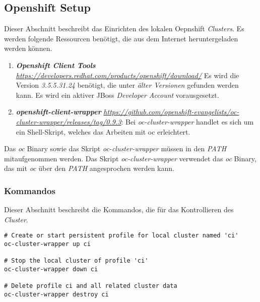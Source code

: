 \subsection{Openshift Setup}
Dieser Abschnitt beschreibt das Einrichten des lokalen Oepnshift \emph{Clusters}.
\newline
\newline
Es werden folgende Ressourcen benötigt, die aus dem Internet heruntergeladen werden können.
\begin{enumerate}
	\item\textbf{\emph{Openshift Client Tools}}
	\newline
	\emph{\url{https://developers.redhat.com/products/openshift/download/}}
	\newline
	Es wird die Version \emph{3.5.5.31.24} benötigt, die unter \emph{älter Versionen} gefunden werden kann.
	\newline
	Es wird ein aktiver JBoss \emph{Developer Account} vorausgesetzt.
	\item\textbf{\emph{openshift-client-wrapper}}
	\newline
	\emph{\url{https://github.com/openshift-evangelists/oc-cluster-wrapper/releases/tag/0.9.3}}:
	\newline
	Bei \emph{oc-cluster-wrapper} handlet es sich um ein Shell-Skript, welches das Arbeiten mit oc erleichtert.
\end{enumerate}
Das \emph{oc} Binary sowie das Skript \emph{oc-cluster-wrapper} müssen in den \emph{PATH} mitaufgenommen werden. Das Skript \emph{oc-cluster-wrapper} verwendet das \emph{oc} Binary, das mit \emph{oc} über den \emph{PATH} angesprochen werden kann.

\subsubsection{Kommandos}
Dieser Abschnitt beschreibt die Kommandos, die für das Kontrollieren des \emph{Cluster}.
\begin{verbatim}
# Create or start persistent profile for local cluster named 'ci'
oc-cluster-wrapper up ci

# Stop the local cluster of profile 'ci'
oc-cluster-wrapper down ci

# Delete profile ci and all related cluster data
oc-cluster-wrapper destroy ci
\end{verbatim}

